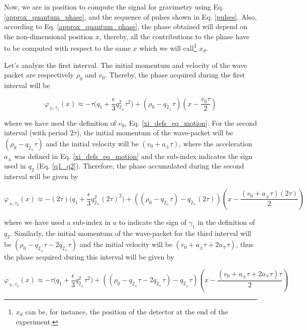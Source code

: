 \documentclass{article}
\begin{document}
Now, we are in position to compute the signal for gravimetry using Eq. \ref{approx_quantum_phase}, and the sequence of pulses shown in Eq. \ref{pulses}. Also, according to Eq. \ref{approx_quantum_phase}, the phase obtained will depend on the non-dimensional position $x$, thereby, all the contributions to the phase have to be computed with respect to the same $x$ which we will call\footnote{$x_{d}$ can be, for instance, the position of the detector at the end of the experiment.} $x_{d}$.

Let's analyze the first interval. The initial momentum and velocity of the wave packet are respectively $\rho_{0}$ and $v_{0}$. Thereby, the phase acquired during the first interval will be

\begin{equation}\label{approx_quantum_phase_1}
\varphi_{\pm, \tau_{1}}(x) \approx -\tau \bigg(q_{1} + \frac{\epsilon}{3} q_{2_{\pm}}^{2} \tau^{2}\bigg) + (\rho_{0} - q_{2_{\pm}} \tau)(x-\frac{v_{0} \tau}{2})
\end{equation}

where we have used the definition of $v_{0}$, Eq. \ref{xi_defs_eq_motion}.
For the second interval (with period $2\tau$), the initial momentum of the wave-packet will be $(\rho_{0} - q_{2_{\pm}} \tau)$ and the initial velocity will be $(v_{0}+a_{\pm}\tau)$, where the acceleration $a_{\pm}$ was defined in Eq. \ref{xi_defs_eq_motion} and the sub-index indicates the sign used in $q_{2}$ (Eq. \ref{q1_q2}). Therefore, the phase accumulated during the second interval will be given by

\begin{equation}\label{approx_quantum_phase_2}
\varphi_{\pm, \tau_{2}}(x) \approx -(2\tau) \bigg(q_{1} + \frac{\epsilon}{3} q_{2_{\mp}}^{2} (2\tau)^{2}\bigg) + ((\rho_{0} - q_{2_{\pm}} \tau)-q_{2_{\mp}} (2\tau))(x-\frac{(v_{0}+a_{\pm}\tau) (2\tau)}{2})
\end{equation}

where we have used a sub-index in $a$ to indicate the sign of $\gamma_{1}$ in the definition of $q_{2}$.
Similarly, the initial momentum of the wave-packet for the third interval will be $(\rho_{0} - q_{2_{\pm}} \tau-2q_{2_{\mp}}\tau)$ and the initial velocity will be $(v_{0}+a_{\pm}\tau + 2 a_{\mp}\tau)$, thus the phase acquired during this interval will be given by

\begin{equation}\label{approx_quantum_phase_3}
\varphi_{\pm, \tau_{3}}(x) \approx -\tau \bigg(q_{1} + \frac{\epsilon}{3} q_{2_{\pm}}^{2} \tau^{2}\bigg) + ((\rho_{0} - q_{2_{\pm}} \tau-2q_{2_{\mp}}\tau)-q_{2_{\pm}} \tau)(x-\frac{(v_{0}+a_{\pm}\tau + 2a_{\mp}\tau) \tau}{2})
\end{equation}
\end{document}
